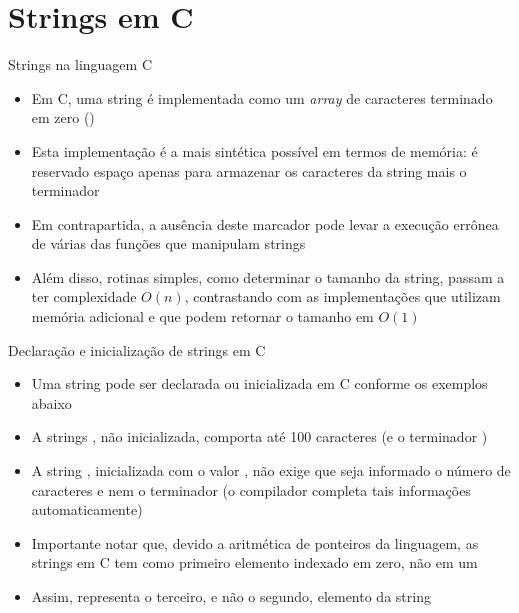 \section{Strings em C}

\begin{frame}[fragile]{Strings na linguagem C}

    \begin{itemize}
        \item Em C, uma string é implementada como um \textit{array} de caracteres terminado em 
            zero ()
        \pause

        \item Esta implementação é a mais sintética possível em termos de memória: é reservado 
            espaço apenas para armazenar os caracteres da string mais o terminador 
        \pause

        \item Em contrapartida, a ausência deste marcador pode levar a execução errônea de várias 
            das funções que manipulam strings
        \pause

        \item Além disso, rotinas simples, como determinar o tamanho da string, passam a ter complexidade $O(n)$, contrastando com as implementações que utilizam memória adicional e que podem retornar o tamanho em $O(1)$
    \end{itemize}

\end{frame}

\begin{frame}[fragile]{Declaração e inicialização de strings em C}

    \begin{itemize}
        \item Uma string pode ser declarada ou inicializada em C conforme os exemplos abaixo
        \pause

        \item A strings , não inicializada, comporta até 100 caracteres
            (e o terminador )
        \pause

        \item A string , inicializada com o valor , não exige que 
            seja informado o número de caracteres e nem o terminador (o compilador completa tais informações automaticamente)
        \pause

        \item Importante notar que, devido a aritmética de ponteiros da linguagem, as strings em 
            C tem como primeiro elemento indexado em zero, não em um
        \pause

        \item Assim,  representa o terceiro, e não o segundo, elemento da string

    \end{itemize}

\end{frame}


